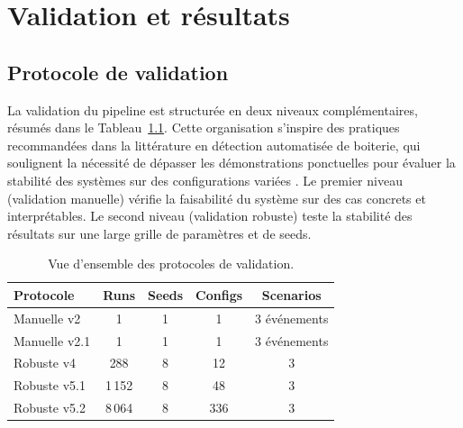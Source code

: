 \chapter{Validation et résultats}
\label{chapitre:validation}

\section{Protocole de validation}

La validation du pipeline est structurée en deux niveaux complémentaires, résumés dans le
Tableau~\ref{tab:protocole_validation}. Cette organisation s'inspire des pratiques recommandées
dans la littérature en détection automatisée de boiterie, qui soulignent la nécessité de
dépasser les démonstrations ponctuelles pour évaluer la stabilité des systèmes sur des
configurations variées \citep{alsaaod2019automatic,oleary2020accelerometers}. Le premier
niveau (validation manuelle) vérifie la faisabilité du système sur des cas concrets et
interprétables. Le second niveau (validation robuste) teste la stabilité des résultats sur
une large grille de paramètres et de seeds.

\begin{table}[H]
    \centering
    \caption{Vue d'ensemble des protocoles de validation.}
    \label{tab:protocole_validation}
    \begin{tabular}{lcccc}
        \toprule
        \textbf{Protocole} & \textbf{Runs} & \textbf{Seeds} & \textbf{Configs} & \textbf{Scenarios} \\
        \midrule
        Manuelle v2         & 1     & 1   & 1   & 3 événements \\
        Manuelle v2.1       & 1     & 1   & 1   & 3 événements \\
        Robuste v4          & 288   & 8   & 12  & 3 \\
        Robuste v5.1        & 1\,152 & 8   & 48  & 3 \\
        Robuste v5.2        & 8\,064 & 8   & 336 & 3 \\
        \bottomrule
    \end{tabular}
\end{table}

